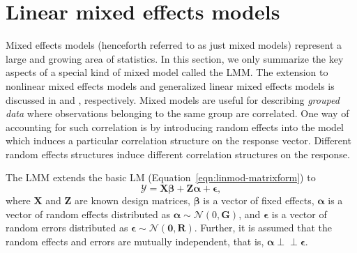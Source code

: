 \documentclass[cmfont,usenames,dvipsnames,leqno]{afit-etd}\usepackage[]{graphicx}\usepackage[]{color}
\newcommand{\indep}{\perp \! \! \! \perp}
\newcommand{\bc}[1]{\ensuremath{\bm{\mathcal{#1}}}}
\newcommand{\mc}[1]{\ensuremath{\mathcal{#1}}}
\newcommand{\X}{\ensuremath{\bm{X}}}
\newcommand{\Z}{\ensuremath{\bm{Z}}}
\begin{document}
\section{Linear mixed effects models}
\label{sec:lmms}
Mixed effects models (henceforth referred to as just mixed models) represent a large and growing area of statistics. In this section, we only summarize the key aspects of a special kind of mixed model called the \ac{LMM}. The extension to nonlinear mixed effects models and generalized linear mixed effects models is discussed in  \citet{pinheiro_mixed_2009} and \citet{mcculloch_generalized_2008}, respectively. Mixed models are useful for describing \textit{grouped data} where observations belonging to the same group are correlated. One way of accounting for such correlation is by introducing random effects into the model which induces a particular correlation structure on the response vector. Different random effects structures induce different correlation structures on the response. 

The \ac{LMM} extends the basic \ac{LM} (Equation~\eqref{eqn:linmod-matrixform}) to
\begin{equation}
\label{eqn:linmod-mixed}
  \bc{Y} = \X\bm{\beta} + \Z\bm{\alpha} + \bm{\epsilon},
\end{equation}
where $\X$ and $\Z$ are known design matrices, $\bm{\beta}$ is a vector of fixed effects, $\bm{\alpha}$ is a vector of random effects distributed as $\bm{\alpha} \sim \mc{N}(0, \bm{G})$, and $\bm{\epsilon}$ is a vector of random errors distributed as $\bm{\epsilon} \sim \mc{N}(\bm{0}, \bm{R})$. Further, it is assumed that the random effects and errors are mutually independent, that is, $\bm{\alpha} \indep \bm{\epsilon}$.
\end{document}
